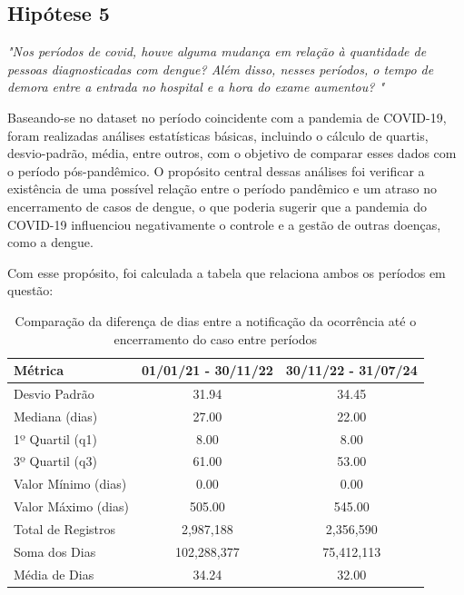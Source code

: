 \documentclass[a4paper, 12pt, twoside]{article}
\begin{document}
\subsection{Hipótese 5}

\emph{"Nos períodos de covid, houve alguma mudança em relação à quantidade de pessoas diagnosticadas com dengue? Além disso, nesses períodos, o tempo de demora entre a entrada no hospital e a hora do exame aumentou?
"}

Baseando-se no dataset no período coincidente com a pandemia de COVID-19, foram realizadas análises estatísticas básicas, incluindo o cálculo de quartis, desvio-padrão, média, entre outros, com o objetivo de comparar esses dados com o período pós-pandêmico. O propósito central dessas análises foi verificar a existência de uma possível relação entre o período pandêmico e um atraso no encerramento de casos de dengue, o que poderia sugerir que a pandemia do COVID-19 influenciou negativamente o controle e a gestão de outras doenças, como a dengue.

Com esse propósito, foi calculada a tabela que relaciona ambos os períodos em questão:


\begin{table}[H]
\centering
\caption{Comparação da diferença de dias entre a notificação da ocorrência até o encerramento do caso entre períodos }

\begin{tabular}{@{}l S[table-format=4.2] S[table-format=4.2]@{}}
\toprule
\textbf{Métrica}          & \textbf{01/01/21 - 30/11/22} & \textbf{30/11/22 - 31/07/24} \\ \midrule
Desvio Padrão                                 & 31.94              & 34.45              \\
Mediana (dias)            & 27.00              & 22.00              \\
1º Quartil (q1)           & 8.00               & 8.00               \\
3º Quartil (q3)           & 61.00              & 53.00              \\
Valor Mínimo (dias)       & 0.00               & 0.00               \\
Valor Máximo (dias)       & 505.00             & 545.00             \\
Total de Registros        & 2,987,188          & 2,356,590          \\
Soma dos Dias             & 102,288,377        & 75,412,113         \\
Média de Dias             & 34.24              & 32.00              \\ \bottomrule
\end{tabular}
\label{tab:comparison}
\end{table} \\
\end{document}

